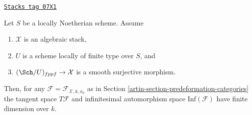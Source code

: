 \begin{lemma}
\label{artin-lemma-finite-dimension}
\href{https://stacks.math.columbia.edu/tag/07X1}{\texttt{Stacks tag 07X1}}

Let $S$ be a locally Noetherian scheme. Assume
\begin{enumerate}
\item $\mathcal{X}$ is an algebraic stack,
\item $U$ is a scheme locally of finite type over $S$, and
\item $(\Sch/U)_{fppf} \to \mathcal{X}$ is a smooth surjective
morphism.
\end{enumerate}
Then, for any $\mathcal{F} = \mathcal{F}_{\mathcal{X}, k, x_0}$ as in
Section \ref{artin-section-predeformation-categories}
the tangent space $T\mathcal{F}$ and infinitesimal automorphism space
$\text{Inf}(\mathcal{F})$ have finite dimension over $k$.
\end{lemma}

